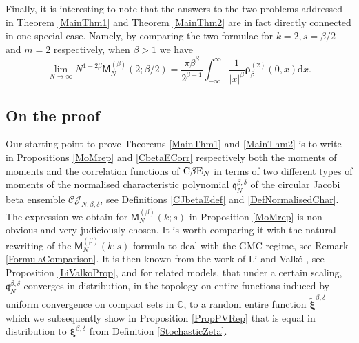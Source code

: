 \documentclass[]{article}
\begin{document}
Finally, it is interesting to note that the answers to the two problems addressed in Theorem \ref{MainThm1} and Theorem \ref{MainThm2} are in fact directly connected in one special case. Namely, by comparing the two formulae for $k=2,s=\beta/2$ and $m=2$ respectively, when $\beta>1$ we have
\begin{equation*}
\lim_{N\to \infty}N^{1-2\beta}\mathsf{M}_N^{(\beta)}(2;\beta/2)=\frac{\pi \beta^{\beta}}{2^{\beta-1}}\int_{-\infty}^\infty \frac{1}{|x|^\beta}\boldsymbol{\rho}_\beta^{(2)}(0,x)\mathrm{d}x.
\end{equation*}

\subsection{On the proof}

Our starting point to prove Theorems \ref{MainThm1} and \ref{MainThm2} is to write in Propositions \ref{MoMrep} and \ref{CbetaECorr} respectively both the moments of moments and the correlation functions of $\textnormal{C}\beta\textnormal{E}_N$ in terms of two different types of moments of the normalised characteristic polynomial $\mathfrak{q}_N^{\beta,\delta}$ of the circular Jacobi beta ensemble $\mathcal{CJ}_{N,\beta,\delta}$, see Definitions \ref{CJbetaEdef} and \ref{DefNormalisedChar}. The expression we obtain for $\mathsf{M}_N^{(\beta)}(k;s)$ in Proposition \ref{MoMrep} is  non-obvious and very judiciously chosen. It is worth comparing it with the natural rewriting of the $\mathsf{M}_N^{(\beta)}(k;s)$ formula to deal with the GMC regime, see Remark \ref{FormulaComparison}. It is then known from the work of Li and Valk\'{o} \cite{LiValko}, see Proposition \ref{LiValkoProp}, and \cite{CNN,ValkoVirag,RandomAnalytic,LambertPaquetteAiry,LambertPaquetteBulk} for related models, that under a certain scaling, $\mathfrak{q}_N^{\beta,\delta}$ converges in distribution, in the topology on entire functions induced by uniform convergence on compact sets in $\mathbb{C}$, to a random entire function $\tilde{\boldsymbol{\xi}}^{\beta,\delta}$ which we subsequently show in Proposition \ref{PropPVRep} that is equal in distribution to $\boldsymbol{\xi}^{\beta,\delta}$ from Definition \ref{StochasticZeta}.
\end{document}
